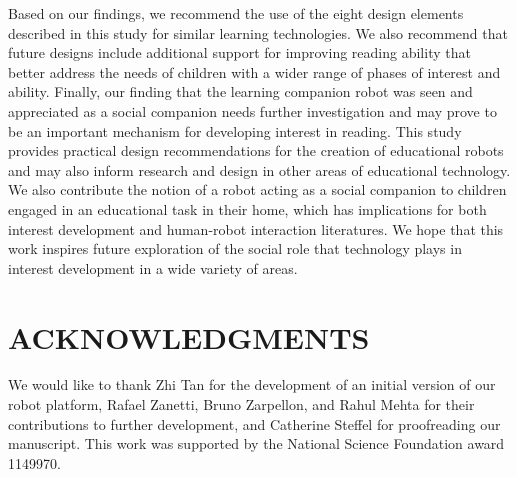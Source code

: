 \documentclass{sigchi}
\begin{document}
Based on our findings, we recommend the use of the eight design elements described in this study for similar learning technologies. We also recommend that future designs include additional support for improving reading ability that better address the needs of children with a wider range of phases of interest and ability. Finally, our finding that the learning companion robot was seen and appreciated as a social companion needs further investigation and may prove to be an important mechanism for developing interest in reading. This study provides practical design recommendations for the creation of educational robots and may also inform research and design in other areas of educational technology. We also contribute the notion of a robot acting as a social companion to children engaged in an educational task in their home, which has implications for both interest development and human-robot interaction literatures. We hope that this work inspires future exploration of the social role that technology plays in interest development in a wide variety of areas.

\section{ACKNOWLEDGMENTS}
{\color{Purple}We would like to thank Zhi Tan for the development of an initial version of our robot platform, Rafael Zanetti, Bruno Zarpellon, and Rahul Mehta for their contributions to further development, and Catherine Steffel for proofreading our manuscript. This work was supported by the National Science Foundation award 1149970.}

\balance{}



\end{document}
